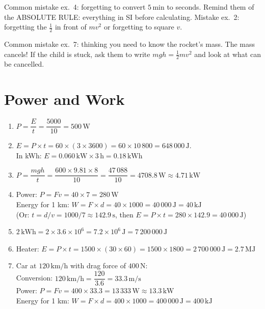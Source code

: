 \documentclass[11pt,a4paper]{article}
\newcommand{\corrbox}[1]{
\begin{tcolorbox}[colback=correctgreen!8!white,colframe=correctgreen!60!black]
#1
\end{tcolorbox}
}
\newcommand{\warnbox}[1]{
\begin{tcolorbox}[colback=warnred!8!white,colframe=warnred!60!black,title=\textbf{Common mistakes}]
#1
\end{tcolorbox}
}
\begin{document}
\warnbox{
Common mistake ex.~4: forgetting to convert $5\,\text{min}$ to seconds. Remind them of the ABSOLUTE RULE: everything in SI before calculating. Mistake ex.~2: forgetting the $\frac{1}{2}$ in front of $mv^{2}$ or forgetting to square $v$.

\vspace{0.2cm}
Common mistake ex.~7: thinking you need to know the rocket's mass. The mass cancels! If the child is stuck, ask them to write $mgh = \frac{1}{2}mv^{2}$ and look at what can be cancelled.
}

\section{Power and Work}

\corrbox{
\begin{enumerate}
\item $P = \dfrac{E}{t} = \dfrac{5000}{10} = 500\,\text{W}$
\item $E = P \times t = 60 \times (3 \times 3600) = 60 \times 10\,800 = 648\,000\,\text{J}$. \\ In kWh: $E = 0.060\,\text{kW} \times 3\,\text{h} = 0.18\,\text{kWh}$
\item $P = \dfrac{mgh}{t} = \dfrac{600 \times 9.81 \times 8}{10} = \dfrac{47\,088}{10} = 4708.8\,\text{W} \approx 4.71\,\text{kW}$
\item Power: $P = Fv = 40 \times 7 = 280\,\text{W}$\\[0.2cm]
Energy for 1 km: $W = F \times d = 40 \times 1000 = 40\,000\,\text{J} = 40\,\text{kJ}$\\[0.1cm]
(Or: $t = d/v = 1000/7 \approx 142.9\,\text{s}$, then $E = P \times t = 280 \times 142.9 = 40\,000\,\text{J}$)
\item $2\,\text{kWh} = 2 \times 3.6 \times 10^{6} = 7.2 \times 10^{6}\,\text{J} = 7\,200\,000\,\text{J}$
\item Heater: $E = P \times t = 1500 \times (30 \times 60) = 1500 \times 1800 = 2\,700\,000\,\text{J} = 2.7\,\text{MJ}$
\item[7.] Car at $120\,\text{km/h}$ with drag force of $400\,\text{N}$:\\[0.2cm]
Conversion: $120\,\text{km/h} = \dfrac{120}{3.6} = 33.3\,\text{m/s}$\\[0.2cm]
Power: $P = Fv = 400 \times 33.3 = 13\,333\,\text{W} \approx 13.3\,\text{kW}$\\[0.2cm]
Energy for 1 km: $W = F \times d = 400 \times 1000 = 400\,000\,\text{J} = 400\,\text{kJ}$
\end{enumerate}
}
\end{document}
